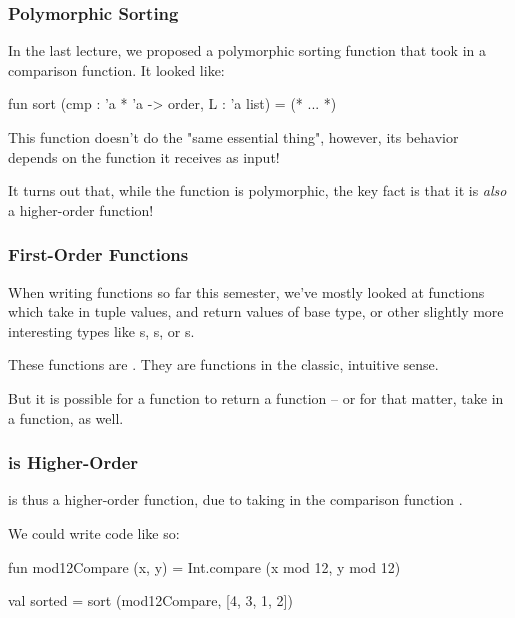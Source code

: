 \documentclass[aspectratio=169, handout]{beamer}
\begin{document}
\begin{frame}[fragile]
  \frametitle{Polymorphic Sorting}

  In the last lecture, we proposed a polymorphic sorting function that took in a 
  comparison function. It looked like:

  \pause
  \vspace{\fill}

  \begin{codeblock}
    fun sort (cmp : 'a * 'a -> order, L : 'a list) = (* ... *)
  \end{codeblock}

  \pause
  \vspace{\fill}

  This  function doesn't do the "same essential thing", however,
  its behavior depends on the  function it receives as input!

  \pause
  \vspace{\fill}

  It turns out that, while the  function is polymorphic, the key
  fact is that it is \textit{also} a higher-order function!
\end{frame}

\begin{frame}[fragile]
  \frametitle{First-Order Functions}

  When writing functions so far this semester, we've mostly looked at functions which take
  in tuple values, and return values of base type, or other slightly more interesting types
  like s, s, or s.

  \pause
  \vspace{\fill}

  These functions are . They are functions in the classic, intuitive sense.

  \pause
  \vspace{\fill}

  But it is possible for a function to return a function -- or for that matter, take in a
  function, as well.

  \pause
  \vspace{\fill}

\end{frame}

\begin{frame}[fragile]
  \frametitle{ is Higher-Order}

   is thus a higher-order function, due to taking in the comparison function
  .

  \pause
  \vspace{\fill}

  We could write code like so:

  \begin{codeblock}
    fun mod12Compare (x, y) = Int.compare (x mod 12, y mod 12) 

    val sorted = sort (mod12Compare, [4, 3, 1, 2])
  \end{codeblock}
\end{frame}
\end{document}
